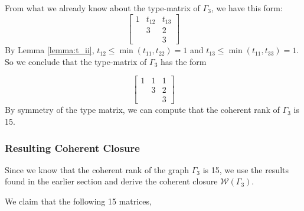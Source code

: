From what we already know about the type-matrix of $\Gamma_3$, we have this form:
\begin{equation*}
    \begin{bmatrix}
        1 & t_{12} & t_{13}\\
         & 3 & 2 \\
         & & 3
    \end{bmatrix}
\end{equation*}
By Lemma \ref{lemma:t_ii}, $t_{12} \leq \min(t_{11},t_{22}) = 1$ and $t_{13} \leq \min(t_{11},t_{33}) = 1$. So we conclude that the type-matrix of $\Gamma_3$ has the form

\begin{equation*}
    \begin{bmatrix}
        1 & 1 & 1\\
         & 3 & 2 \\
         & & 3
    \end{bmatrix}
\end{equation*}
By symmetry of the type matrix, we can compute that the coherent rank of $\Gamma_3$ is 15.


\subsubsection{Resulting Coherent Closure}
Since we know that the coherent rank of the graph $\Gamma_3$ is 15, we use the results found in the earlier section and derive the coherent closure $\mathcal{W}(\Gamma_3)$.

We claim that the following 15 matrices,

